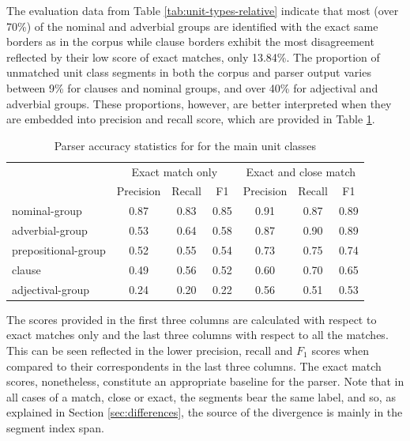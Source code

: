     The evaluation data from Table \ref{tab:unit-types-relative} indicate that most (over 70\%) of the nominal and adverbial groups are identified with the exact same borders as in the corpus while clause borders exhibit the most disagreement reflected by their low score of exact matches, only 13.84\%. The proportion of unmatched unit class segments in both the corpus and parser output varies between 9\% for clauses and nominal groups, and over 40\% for adjectival and adverbial groups. These proportions, however, are better interpreted when they are embedded into precision and recall score, which are provided in Table  \ref{tab:unit-types-combined-F1}. 
    \begin{table}[!ht]
    \centering
    \begin{tabular}{lcccccc}
    \toprule
     & \multicolumn{3}{c}{Exact match only} & \multicolumn{3}{c}{Exact and close match} \\ \cline{2-7} 
     & Precision & Recall & F1 & Precision & Recall & F1 \\ 
    \midrule
    nominal-group & 0.87 & 0.83 & 0.85 & 0.91 & 0.87 & 0.89 \\
    adverbial-group & 0.53 & 0.64 & 0.58 & 0.87 & 0.90 & 0.89 \\
    prepositional-group & 0.52 & 0.55 & 0.54 & 0.73 & 0.75 & 0.74 \\
    clause & 0.49 & 0.56 & 0.52 & 0.60 & 0.70 & 0.65 \\
    adjectival-group & 0.24 & 0.20 & 0.22 & 0.56 & 0.51 & 0.53 \\ 
    \bottomrule
    \end{tabular}
    \caption{Parser accuracy statistics for for the main unit classes}
    \label{tab:unit-types-combined-F1}
    \end{table}
    
    The scores provided in the first three columns are calculated with respect to exact matches only and the last three columns with respect to all the matches. This can be seen reflected in the lower precision, recall and $F_1$ scores when compared to their correspondents in the last three columns. The exact match scores, nonetheless, constitute an appropriate baseline for the parser. Note that in all cases of a match, close or exact, the segments bear the same label, and so, as explained in Section \ref{sec:differences}, the source of the divergence is mainly in the segment index span. 
    
